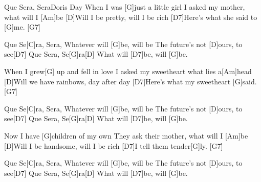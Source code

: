\documentclass[../main.tex]{subfiles}
\begin{document}
\begin{song}[2]{Que Sera, Sera}{Doris Day}{}
When I was [G]just a little girl
I asked my mother, what will I [Am]be
[D]Will I be pretty, will I be rich
[D7]Here's what she said to [G]me. [G7]{\h}

Que Se[C]ra, Sera,
Whatever will [G]be, will be
The future's not [D]ours, to see[D7]{\hh}
Que Sera, Se[G]ra[D]{\hh}
What will [D7]be, will [G]be.

When I grew[G] up and fell in love
I asked my sweetheart what lies a[Am]head
[D]Will we have rainbows, day after day
[D7]Here's what my sweetheart [G]said. [G7]{\h}

Que Se[C]ra, Sera,
Whatever will [G]be, will be
The future's not [D]ours, to see[D7]{\hh}
Que Sera, Se[G]ra[D]{\hh}
What will [D7]be, will [G]be.

Now I have [G]children of my own
They ask their mother, what will I [Am]be
[D]Will I be handsome, will I be rich
[D7]I tell them tender[G]ly. [G7]{\h}

Que Se[C]ra, Sera,
Whatever will [G]be, will be
The future's not [D]ours, to see[D7]{\hh}
Que Sera, Se[G]ra[D]{\hh}
What will [D7]be, will [G]be.
\end{song}
\end{document}
